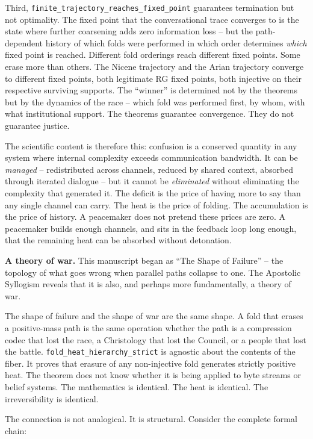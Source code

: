\documentclass[
  11pt,
]{article}
\begin{document}
Third, \texttt{finite\_trajectory\_reaches\_fixed\_point} guarantees
termination but not optimality. The fixed point that the conversational
trace converges to is the state where further coarsening adds zero
information loss -- but the path-dependent history of which folds were
performed in which order determines \emph{which} fixed point is reached.
Different fold orderings reach different fixed points. Some erase more
than others. The Nicene trajectory and the Arian trajectory converge to
different fixed points, both legitimate RG fixed points, both injective
on their respective surviving supports. The ``winner'' is determined not
by the theorems but by the dynamics of the race -- which fold was
performed first, by whom, with what institutional support. The theorems
guarantee convergence. They do not guarantee justice.

The scientific content is therefore this: confusion is a conserved
quantity in any system where internal complexity exceeds communication
bandwidth. It can be \emph{managed} -- redistributed across channels,
reduced by shared context, absorbed through iterated dialogue -- but it
cannot be \emph{eliminated} without eliminating the complexity that
generated it. The deficit is the price of having more to say than any
single channel can carry. The heat is the price of folding. The
accumulation is the price of history. A peacemaker does not pretend
these prices are zero. A peacemaker builds enough channels, and sits in
the feedback loop long enough, that the remaining heat can be absorbed
without detonation.

\textbf{A theory of war.} This manuscript began as ``The Shape of
Failure'' -- the topology of what goes wrong when parallel paths
collapse to one. The Apostolic Syllogism reveals that it is also, and
perhaps more fundamentally, a theory of war.

The shape of failure and the shape of war are the same shape. A fold
that erases a positive-mass path is the same operation whether the path
is a compression codec that lost the race, a Christology that lost the
Council, or a people that lost the battle.
\texttt{fold\_heat\_hierarchy\_strict} is agnostic about the contents of
the fiber. It proves that erasure of any non-injective fold generates
strictly positive heat. The theorem does not know whether it is being
applied to byte streams or belief systems. The mathematics is identical.
The heat is identical. The irreversibility is identical.

The connection is not analogical. It is structural. Consider the
complete formal chain:
\end{document}

